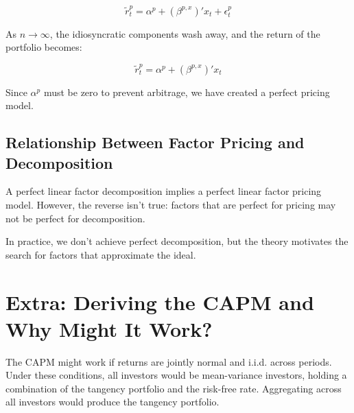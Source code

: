 \documentclass{article}
\begin{document}
\[
\tilde{r}^p_t = \alpha^p + (\beta^{p, x})' x_t + \epsilon^p_t
\]

As $n \rightarrow \infty$, the idiosyncratic components wash away, and the return of the portfolio becomes:

\[
\tilde{r}^p_t = \alpha^{p} + (\beta^{p, x})' x_t
\]

Since $\alpha^{p}$ must be zero to prevent arbitrage, we have created a perfect pricing model.

\subsection{Relationship Between Factor Pricing and Decomposition}
A perfect linear factor decomposition implies a perfect linear factor pricing model. However, the reverse isn’t true: factors that are perfect for pricing may not be perfect for decomposition.

In practice, we don’t achieve perfect decomposition, but the theory motivates the search for factors that approximate the ideal.

\section{Extra: Deriving the CAPM and Why Might It Work?}
The CAPM might work if returns are jointly normal and i.i.d. across periods. Under these conditions, all investors would be mean-variance investors, holding a combination of the tangency portfolio and the risk-free rate. Aggregating across all investors would produce the tangency portfolio.
\end{document}
